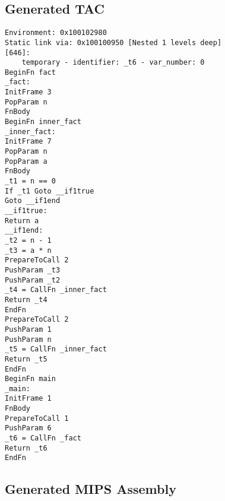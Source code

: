 \subsection{Generated TAC}
\begin{verbatim}
Environment: 0x100102980
Static link via: 0x100100950 [Nested 1 levels deep]
[646]:
	temporary - identifier: _t6 - var_number: 0
BeginFn fact
_fact:
InitFrame 3
PopParam n
FnBody
BeginFn inner_fact
_inner_fact:
InitFrame 7
PopParam n
PopParam a
FnBody
_t1 = n == 0
If _t1 Goto __if1true
Goto __if1end
__if1true:
Return a
__if1end:
_t2 = n - 1
_t3 = a * n
PrepareToCall 2
PushParam _t3
PushParam _t2
_t4 = CallFn _inner_fact
Return _t4
EndFn
PrepareToCall 2
PushParam 1
PushParam n
_t5 = CallFn _inner_fact
Return _t5
EndFn
BeginFn main
_main:
InitFrame 1
FnBody
PrepareToCall 1
PushParam 6
_t6 = CallFn _fact
Return _t6
EndFn
\end{verbatim}\subsection{Generated MIPS Assembly}
